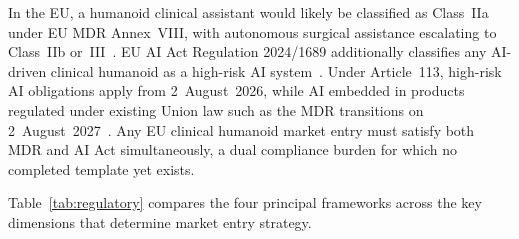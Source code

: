 In the EU, a humanoid clinical assistant would likely be classified as Class~IIa
under EU MDR Annex~VIII, with autonomous surgical assistance escalating to
Class~IIb or~III~\cite{eumdr2017}. EU AI Act Regulation 2024/1689 additionally classifies any
AI-driven clinical humanoid as a high-risk AI system~\cite{euaiact2024,solaiman2024regulating}. Under Article~113,
high-risk AI obligations apply from 2~August~2026, while AI embedded in products
regulated under existing Union law such as the MDR transitions on
2~August~2027~\cite{euaiact2024}. Any EU clinical humanoid market entry must satisfy both MDR and AI Act
simultaneously, a dual compliance burden for which no completed template yet
exists.

Table~\ref{tab:regulatory} compares the four principal frameworks across the key
dimensions that determine market entry strategy.

